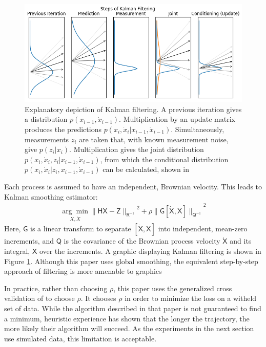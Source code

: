 \documentclass{article}
\newcommand{\mat}[1]{\boldsymbol{\mathsf{#1}}}
\begin{document}
\begin{figure}
    \label{fig:kalman}
    \centering
    \includegraphics[width=\textwidth]{images/static/kalman_fit_demo2.png}
    \caption{Explanatory depiction of Kalman filtering.
    A previous iteration gives a distribution $p(x_{i-1},\dot x_{i-1})$.
    Multiplication by an update matrix produces the predictions $p(x_i, \dot x_i|x_{i-1}, \dot x_{i-1})$.
    Simultaneously, measurements $z_i$ are taken that, with known measurement noise, give $p(z_i|x_i)$.
    Multiplication gives the joint distribution $p(x_i, \dot x_i, z_i| x_{i-1}, \dot x_{i-1})$, from which the conditional distribution $p(x_i, \dot x_i|z_i, x_{i-1}, \dot x_{i-1})$ can be calculated, shown in \cite{Eaton2007}}
\end{figure}


Each process is assumed to have an independent, Brownian velocity.  This leads to Kalman smoothing estimator:
\begin{align}
    \underset{X, \dot X}{\arg\min}{\|\mat H \mat X - \mat Z\|_{\mat R^{-1}}}^2 + \rho {\|\mat G [\mat {\dot X}, \mat X]\|_{\mat Q^{-1}}}^2
\end{align}
Here, $\mat G$ is a linear transform to separate $[\mat{\dot X}, \mat X]$ into independent, mean-zero increments, and $\mat Q$ is the covariance of the Brownian process velocity $\mat{\dot X}$ and its integral, $\mat X$ over the increments.  A graphic displaying Kalman filtering is shown in Figure \ref{fig:kalman}.  Although this paper uses global smoothing, the equivalent step-by-step approach of filtering is more amenable to graphics

In practice, rather than choosing $\rho$, this paper uses the generalized cross validation of \cite{Barratt2020} to choose $\rho$.  It chooses $\rho$ in order to minimize the loss on a witheld set of data.  While the algorithm described in that paper is not guaranteed to find a minimum, heuristic experience has shown that the longer the trajectory, the more likely their algorithm will succeed.  As the experiments in the next section use simulated data, this limitation is acceptable.
\end{document}
